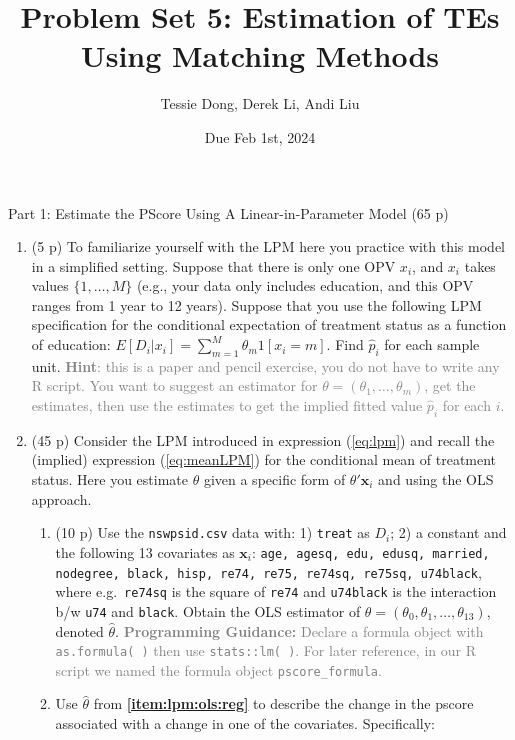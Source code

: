 \documentclass[
]{article}
\title{Problem Set 5: Estimation of TEs Using Matching Methods}
\author{Tessie Dong, Derek Li, Andi Liu}
\date{Due Feb 1st, 2024}
\begin{document}
\maketitle

\newlength{\dhatheight}
\newcommand{\doublehat}[1]{%
    \settoheight{\dhatheight}{\ensuremath{\hat{#1}}}%
    \addtolength{\dhatheight}{-0.35ex}%
    \hat{\vphantom{\rule{1pt}{\dhatheight}}%
    \smash{\hat{#1}}}}



\begin{center}
{\LARGE Part 1: Estimate the PScore Using A Linear-in-Parameter Model (65 p)}
\end{center}

\begin{enumerate}
\def\labelenumi{\arabic{enumi}.}
\item
  (5 p) To familiarize yourself with the LPM here you practice with this
  model in a simplified setting. Suppose that there is only one OPV
  \(x_i\), and \(x_i\) takes values \(\{1,\ldots,M\}\) (e.g., your data
  only includes education, and this OPV ranges from 1 year to 12 years).
  Suppose that you use the following LPM specification for the
  conditional expectation of treatment status as a function of
  education: \(E[D_i|x_i]=\sum_{m=1}^{M}\theta_m1[x_i=m]\). Find
  \(\hat{p}_i\) for each sample unit.
  \textcolor{gray}{\textbf{Hint}: this is a paper and pencil exercise, you do not have to write any R script. You want to suggest an estimator for $\theta=(\theta_1,\ldots,\theta_m)$, get the estimates, then use the estimates to get the implied fitted value $\hat{p}_i$ for each $i$.}
\item
  (45 p) Consider the LPM introduced in expression (\ref{eq:lpm}) and
  recall the (implied) expression (\ref{eq:meanLPM}) for the conditional
  mean of treatment status. Here you estimate \(\theta\) given a
  specific form of \(\theta'\mathbf{x}_{i}\) and using the OLS
  approach.\label{item:lpm:ols}

  \begin{enumerate}
  \def\labelenumii{\alph{enumii}.}
  \item
    (10 p) Use the \texttt{nswpsid.csv} data with: 1) \texttt{treat} as
    \(D_i\); 2) a constant and the following 13 covariates as
    \(\mathbf{x}_{i}\):
    \texttt{age, agesq, edu, edusq, married, nodegree, black, hisp, re74, re75, re74sq, re75sq, u74black},
    where e.g.~\texttt{re74sq} is the square of \texttt{re74} and
    \texttt{u74black} is the interaction b/w \texttt{u74} and
    \texttt{black}. Obtain the OLS estimator of
    \(\theta=(\theta_0,\theta_1,\ldots,\theta_{13})\), denoted
    \(\hat{\theta}\).
    \textcolor{gray}{\textbf{Programming Guidance:} Declare a formula object with \texttt{as.formula( )} then use \texttt{stats::lm( )}. For later reference, in our R script we named the formula object \texttt{pscore\_formula}.}
    \label{item:lpm:ols:reg}
  \item
    Use \(\hat{\theta}\) from \textbf{\ref{item:lpm:ols:reg}} to
    describe the change in the pscore associated with a change in one of
    the covariates. Specifically:


\end{enumerate}
\end{enumerate}
\end{document}
